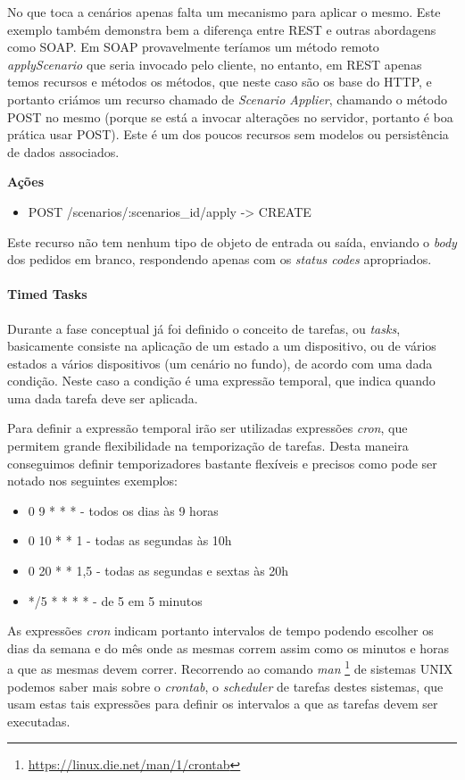 No que toca a cenários apenas falta um mecanismo para aplicar o mesmo. Este exemplo também demonstra bem a diferença entre REST e outras abordagens como SOAP. Em SOAP provavelmente teríamos um método remoto \textit{applyScenario} que seria invocado pelo cliente, no entanto, em REST apenas temos recursos e métodos os métodos, que neste caso são os base do HTTP, e portanto criámos um recurso chamado de \textit{Scenario Applier}, chamando o método POST no mesmo (porque se está a invocar alterações no servidor, portanto é boa prática usar POST). Este é um dos poucos recursos sem modelos ou persistência de dados associados.

\textbf{Ações}
\begin{itemize}
    \item POST /scenarios/:scenarios{\_}id/apply -> CREATE
\end{itemize}

Este recurso não tem nenhum tipo de objeto de entrada ou saída, enviando o \textit{body} dos pedidos em branco, respondendo apenas com os \textit{status codes} apropriados.

\paragraph*{Timed Tasks}

Durante a fase conceptual já foi definido o conceito de tarefas, ou \textit{tasks}, basicamente consiste na aplicação de um estado a um dispositivo, ou de vários estados a vários dispositivos (um cenário no fundo), de acordo com uma dada condição. Neste caso a condição é uma expressão temporal, que indica quando uma dada tarefa deve ser aplicada.

Para definir a expressão temporal irão ser utilizadas expressões \textit{cron}, que permitem grande flexibilidade na temporização de tarefas. Desta maneira conseguimos definir temporizadores bastante flexíveis e precisos como pode ser notado nos seguintes exemplos:
\begin{itemize}
    \item 0 9 * * * - todos os dias às 9 horas
    \item 0 10 * * 1 - todas as segundas às 10h
    \item 0 20 * * 1,5 - todas as segundas e sextas às 20h
    \item */5 * * * * - de 5 em 5 minutos
\end{itemize}

As expressões \textit{cron} indicam portanto intervalos de tempo podendo escolher os dias da semana e do mês onde as mesmas correm assim como os minutos e horas a que as mesmas devem correr. Recorrendo ao comando \textit{man} \footnote{\url{https://linux.die.net/man/1/crontab}} de sistemas UNIX podemos saber mais sobre o \textit{crontab}, o \textit{scheduler} de tarefas destes sistemas, que usam estas tais expressões para definir os intervalos a que as tarefas devem ser executadas.

